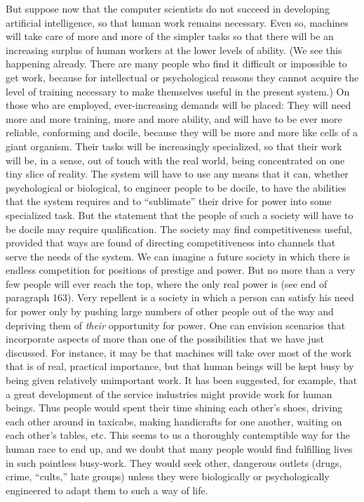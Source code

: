  But suppose now that the computer scientists do not succeed in developing artificial intelligence, so that human work remains necessary. Even so, machines will take care of more and more of the simpler tasks so that there will be an increasing surplus of human workers at the lower levels of ability. (We see this happening already. There are many people who find it difficult or impossible to get work, because for intellectual or psychological reasons they cannot acquire the level of training necessary to make themselves useful in the present system.) On those who are employed, ever-increasing demands will be placed: They will need more and more training, more and more ability, and will have to be ever more reliable, conforming and docile, because they will be more and more like cells of a giant organism. Their tasks will be increasingly specialized, so that their work will be, in a sense, out of touch with the real world, being concentrated on one tiny slice of reality. The system will have to use any means that it can, whether psychological or biological, to engineer people to be docile, to have the abilities that the system requires and to “sublimate” their drive for power into some specialized task. But the statement that the people of such a society will have to be docile may require qualification. The society may find competitiveness useful, provided that ways are found of directing competitiveness into channels that serve the needs of the system. We can imagine a future society in which there is endless competition for positions of prestige and power. But no more than a very few people will ever reach the top, where the only real power is (see end of paragraph 163). Very repellent is a society in which a person can satisfy his need for power only by pushing large numbers of other people out of the way and depriving them of {\em their} opportunity for power.
 One can envision scenarios that incorporate aspects of more than one of the possibilities that we have just discussed. For instance, it may be that machines will take over most of the work that is of real, practical importance, but that human beings will be kept busy by being given relatively unimportant work. It has been suggested, for example, that a great development of the service industries might provide work for human beings. Thus people would spent their time shining each other’s shoes, driving each other around in taxicabs, making handicrafts for one another, waiting on each other’s tables, etc. This seems to us a thoroughly contemptible way for the human race to end up, and we doubt that many people would find fulfilling lives in such pointless busy-work. They would seek other, dangerous outlets (drugs, crime, “cults,” hate groups) unless they were biologically or psychologically engineered to adapt them to such a way of life.

